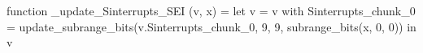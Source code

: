 function _update_Sinterrupts_SEI (v, x) = let v = { v with Sinterrupts_chunk_0 = update_subrange_bits(v.Sinterrupts_chunk_0, 9, 9, subrange_bits(x, 0, 0)) } in
  v
